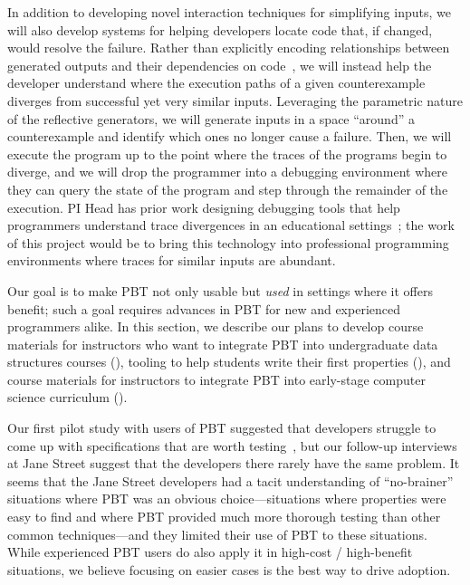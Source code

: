 In addition to developing novel interaction techniques for simplifying inputs,
we will also develop systems for helping developers locate code that, if
changed, would resolve the failure. Rather than explicitly encoding
relationships between generated outputs and their dependencies on
code~\cite{ref:ko2009finding}, we will instead help the developer
understand where the execution paths of a given counterexample diverges from
successful yet very similar inputs. Leveraging the parametric nature of the
reflective generators, we will generate inputs in a space ``around'' a
counterexample and identify which ones no longer cause a failure.  Then, we will
execute the program up to the point where the traces of the programs begin to
diverge, and we will drop the programmer into a debugging environment where
they can query the state of the program and step through the remainder of the
execution. PI Head has prior work designing debugging tools that help
programmers understand trace divergences in an educational
settings~\cite{ref:suzuki2017tracediff}; the work of this project would be to
bring this technology into professional programming environments where traces
for similar inputs are abundant.

%
Our goal is to make PBT not only usable but {\em
used} in settings where it offers benefit; such a goal requires advances in PBT
 for
new and experienced programmers alike. In this section, we describe
our plans to develop
course materials for instructors who want to integrate PBT into
undergraduate data structures courses (),
%
tooling to help students write their first properties
(),
%
and course materials for instructors to integrate PBT into
early-stage computer science curriculum ().


%
Our first pilot study with users of PBT suggested that developers struggle to
come up with specifications that are worth testing~\cite{ref:goldstein2022some},
but
our follow-up interviews at Jane Street suggest that the developers there
rarely have the same problem. It seems that the Jane Street developers had
a tacit
understanding of ``no-brainer'' situations where PBT was an obvious
choice---situations where properties were easy to find and where PBT provided
much more thorough testing than other common techniques---and they limited their
use of PBT to these situations.
While experienced PBT users do also apply it in
high-cost / high-benefit situations, we believe
focusing on easier cases is the best way to drive adoption.

